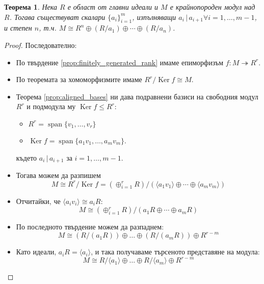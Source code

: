 \documentclass{article}
\newif\ifusemulticols
\theoremstyle{definition}
\theoremstyle{remark}
\theoremstyle{plain}
\newtheorem{theorem}{Теорема}
\theoremstyle{plain}
\newenvironment{mymulticols}
    { \ifusemulticols \begin{multicols}{2} \fi }
    { \ifusemulticols \end{multicols} \fi }
\DeclareMathOperator{\vecspan}{span}
\DeclareMathOperator{\Ker}{Ker}
\begin{document}
\begin{mymulticols}
\begin{theorem}
    Нека $R$ е област от главни идеали и $M$ е крайнопороден модул над $R$. Тогава съществуват
    скалари $\{ a_i \}_{i=1}^m$, изпълняващи $a_i \,|\, a_{i+1} \forall i = 1,\ldots,m-1$, и степен
    $n$, т.ч. $M \cong R^n \oplus (R/a_1) \oplus \cdots \oplus (R/a_n)$.
\end{theorem}
\begin{proof}
    Последователно:
    \begin{itemize}
        \item По твърдение \ref{prop:finitely_generated_rank} имаме епиморфизъм $f : M
            \twoheadrightarrow R^r$.
            \item По теоремата за хомоморфизмите имаме $R^r / \Ker f \cong M$.
            \item Теорема \ref{prop:aligned_bases} ни дава подравнени базиси на свободния модул
                $R^r$ и подмодула му $\Ker f \le R^r$:
                \begin{itemize}
                    \item $R^r = \vecspan \{ v_1, \ldots, v_r\}$
                    \item $\Ker f = \vecspan \{ a_1 v_1, \ldots, a_m v_m\}$.
                \end{itemize}
                където $a_i \,| \,a_{i+1}$ за $i=1,\ldots,m-1$.

            \item Тогава можем да разпишем $$M\cong R^r/\Ker f = (\oplus_{i=1}^r R)/(\langle
                a_1 v_1 \rangle \oplus \cdots \oplus \langle a_m v_m \rangle) $$

            \item Отчитайки, че $\langle a_iv_i \rangle \cong a_iR$:
                $$M \cong (\oplus_{i=1}^r R)/(a_1R\oplus\cdots\oplus a_mR)$$

            \item По последното твърдение можем да разпаднем: $$M \cong
                \left(R/(a_1R)\right)\oplus\ldots\oplus\left(R/(a_mR)\right)\oplus R^{r-m}$$

                \item Като идеали, $a_iR = \langle a_i \rangle$, и така получаваме търсеното
                    представяне на модула:
                    $$M \cong R/\langle a_1 \rangle \oplus \ldots \oplus
                    R/\langle a_m \rangle \oplus R^{r-m}$$
    \end{itemize}
\end{proof}


\end{mymulticols}
\end{document}
